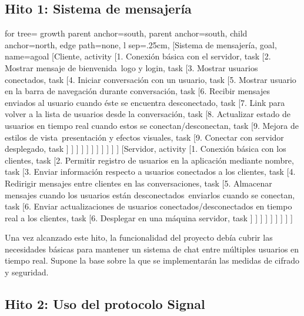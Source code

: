 \subsection{Hito 1: Sistema de mensajería}
\begin{adjustbox}{margin=2.5ex 5ex 2.5ex 2.5ex,center}
	\begin{forest} for tree={
	    growth parent anchor=south,
	    parent anchor=south,
	    child anchor=north,
	    edge path={none}, 
	    l sep=.25cm,
	}   
	[Sistema de mensajería, goal, name=agoal
	    [Cliente, activity
	        [1. Conexión básica con el servidor, task
	       	[2. Mostrar mensaje de bienvenida\, logo y login, task
	        [3. Mostrar usuarios conectados, task
	        [4. Iniciar conversación con un usuario, task
			[5. Mostrar usuario en la barra de navegación durante conversación, task
			[6. Recibir mensajes enviados al usuario cuando éste se encuentra desconectado, task			
	        [7. Link para volver a la lista de usuarios desde la conversación, task
	        [8. Actualizar estado de usuarios en tiempo real cuando estos se conectan/desconectan, task
	        [9. Mejora de estilos de vista\, presentación y efectos visuales, task	        
	        [9. Conectar con servidor desplegado, task	  	        
	        ] ] ] ] ] ] ] ] ] ] ]
	    [Servidor, activity
	        [1. Conexión básica con los clientes, task
			[2. Permitir registro de usuarios en la aplicación mediante nombre, task
	        [3. Enviar información respecto a usuarios conectados a los clientes, task
	        [4. Redirigir mensajes entre clientes en las conversaciones, task
	        [5. Almacenar mensajes cuando los usuarios están desconectados\, enviarlos cuando se conectan, task
	        [6. Enviar actualizaciones de usuarios conectados/desconectados en tiempo real a los clientes, task
 	        [6. Desplegar en una máquina servidor, task
	        ] ] ] ] ] ] ] ] ]
	\end{forest}
\end{adjustbox}

Una vez alcanzado este hito, la funcionalidad del proyecto debía cubrir las necesidades básicas para mantener un sistema de chat entre múltiples usuarios en tiempo real. Supone la base sobre la que se implementarán las medidas de cifrado y seguridad.
	
\subsection{Hito 2: Uso del protocolo Signal}

